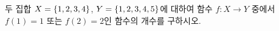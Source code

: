 두 집합 $X=\{1{,}\mkern3mu\mathopen{}2{,}\mkern3mu\mathopen{}3{,}\mkern3mu\mathopen{}4\}$, $Y=\{1{,}\mkern3mu\mathopen{}2{,}\mkern3mu\mathopen{}3{,}\mkern3mu\mathopen{}4{,}\mkern3mu\mathopen{}5\}$에 대하여 함수 $f:X\longrightarrow Y$ 중에서 $f(1)=1$ 또는 $f(2)=2$인 함수의 개수를 구하시오.
